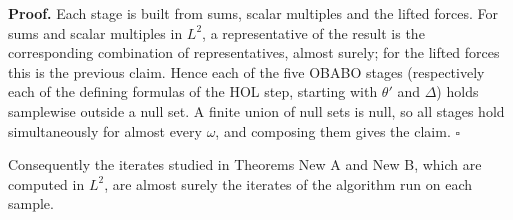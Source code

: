 \documentclass[11pt,a4paper]{report}
\begin{document}
\textbf{Proof.} Each stage is built from sums, scalar multiples and the lifted forces. For sums and scalar multiples in \(L^2\), a representative of the result is the corresponding combination of representatives, almost surely; for the lifted forces this is the previous claim. Hence each of the five OBABO stages (respectively each of the defining formulas of the HOL step, starting with \(\theta'\) and \(\Delta\)) holds samplewise outside a null set. A finite union of null sets is null, so all stages hold simultaneously for almost every \(\omega\), and composing them gives the claim. \(\square\)




Consequently the iterates studied in Theorems New A and New B, which are computed in \(L^2\), are almost surely the iterates of the algorithm run on each sample.
\end{document}
